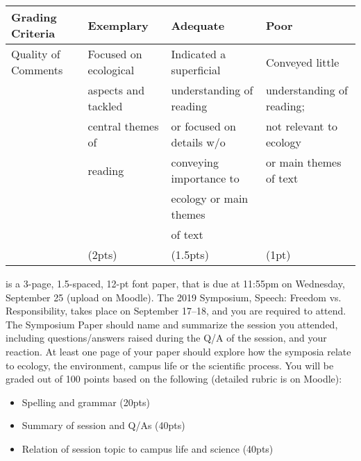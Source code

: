 \documentclass{tufte-handout}
\begin{document}
\begin{fullwidth}
\begin{tabular}{l l l l}
\\
\hline
\textbf{Grading Criteria} & \textbf{Exemplary} & \textbf{Adequate} & \textbf{Poor} \\
\hline
Quality of Comments & Focused on ecological & Indicated a superficial & Conveyed little \\
& aspects and tackled & understanding of reading & understanding of reading; \\
& central themes of & or focused on details w/o& not relevant to ecology \\
& reading &  conveying importance to & or main themes of text \\
& & ecology or main themes & \\
& & of text & \\
& (2pts) & (1.5pts) & (1pt) \\
\hline
\end{tabular}

 is a 3-page, 1.5-spaced, 12-pt font paper, that is due at 
11:55pm on Wednesday, September 25 (upload on Moodle). 											%
The 2019 Symposium, Speech: Freedom vs. Responsibility, 		 %
takes place on September 17--18, 													 %
and you are required to attend. The Symposium Paper should name and summarize the session you attended, including questions/answers raised during the Q/A of the session, and your reaction. At least one page of your paper should explore how the symposia relate to ecology, the environment, campus life or the scientific process. You will be graded out of 100 points based on the following (detailed rubric is on Moodle): 

\begin{itemize}
\item Spelling and grammar (20pts)
\item Summary of session and Q/As (40pts)
\item Relation of session topic to campus life and science (40pts)
\end{itemize}




\end{fullwidth}
\end{document}
